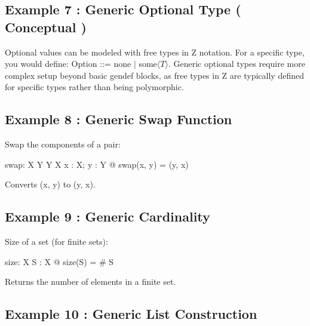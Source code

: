 \documentclass[a4paper,10pt,fleqn]{article}
\begin{document}
\bigskip

\subsection*{Example 7 : Generic Optional Type ( Conceptual )}

\noindent Optional values can be modeled with free types in Z notation. For a specific type, you would define: Option ::= none $|$ some$\langle T \rangle$. Generic optional types require more complex setup beyond basic gendef blocks, as free types in Z are typically defined for specific types rather than being polymorphic.

\bigskip

\subsection*{Example 8 : Generic Swap Function}

\noindent Swap the components of a pair:

\bigskip

\begin{gendef}[X, Y]
  swap: X \cross Y \fun Y \cross X
\where
  \forall x : X; y : Y @ swap(x, y) = (y, x)
\end{gendef}

\noindent Converts (x, y) to (y, x).

\bigskip

\subsection*{Example 9 : Generic Cardinality}

\noindent Size of a set (for finite sets):

\bigskip

\begin{gendef}[X]
  size: \power X \fun \nat
\where
  \forall S : \power X @ size(S) = \# S
\end{gendef}

\noindent Returns the number of elements in a finite set.

\bigskip

\subsection*{Example 10 : Generic List Construction}
\end{document}
